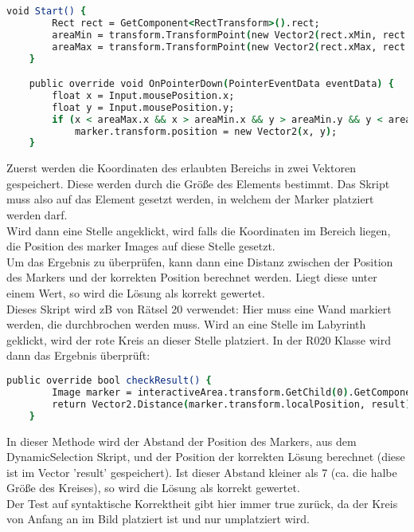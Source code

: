 {\begin{lstlisting}[language=csh, caption={DynamicSelection Skript}]
	void Start() {
        Rect rect = GetComponent<RectTransform>().rect;
        areaMin = transform.TransformPoint(new Vector2(rect.xMin, rect.yMin));
        areaMax = transform.TransformPoint(new Vector2(rect.xMax, rect.yMax));
    }

    public override void OnPointerDown(PointerEventData eventData) {
        float x = Input.mousePosition.x;
        float y = Input.mousePosition.y;
        if (x < areaMax.x && x > areaMin.x && y > areaMin.y && y < areaMax.y)
            marker.transform.position = new Vector2(x, y);
    }
\end{lstlisting}
Zuerst werden die Koordinaten des erlaubten Bereichs in zwei Vektoren gespeichert. Diese werden durch die Größe des Elements bestimmt. Das Skript muss also auf das Element gesetzt werden, in welchem der Marker platziert werden darf. \\
Wird dann eine Stelle angeklickt, wird falls die Koordinaten im Bereich liegen, die Position des marker Images auf diese Stelle gesetzt.\\
Um das Ergebnis zu überprüfen, kann dann eine Distanz zwischen der Position des Markers und der korrekten Position berechnet werden. Liegt diese unter einem Wert, so wird die Lösung als korrekt gewertet.\\

Dieses Skript wird zB von Rätsel 20 verwendet:
Hier muss eine Wand markiert werden, die durchbrochen werden muss. Wird an eine Stelle im Labyrinth geklickt, wird der rote Kreis an dieser Stelle platziert. In der R020 Klasse wird dann das Ergebnis überprüft:
\begin{lstlisting}[language=csh, caption={checkResult Methode in der Klasse von Rätsel 3}]
public override bool checkResult() {
        Image marker = interactiveArea.transform.GetChild(0).GetComponent<DynamicSelection>().marker;
        return Vector2.Distance(marker.transform.localPosition, result) < 7;
    }
\end{lstlisting}
In dieser Methode wird der Abstand der Position des Markers, aus dem DynamicSelection Skript, und der Position der korrekten Lösung berechnet (diese ist im Vector 'result' gespeichert). Ist dieser Abstand kleiner als 7 (ca. die halbe Größe des Kreises), so wird die Lösung als korrekt gewertet.\\
Der Test auf syntaktische Korrektheit gibt hier immer true zurück, da der Kreis von Anfang an im Bild platziert ist und nur umplatziert wird.

}
